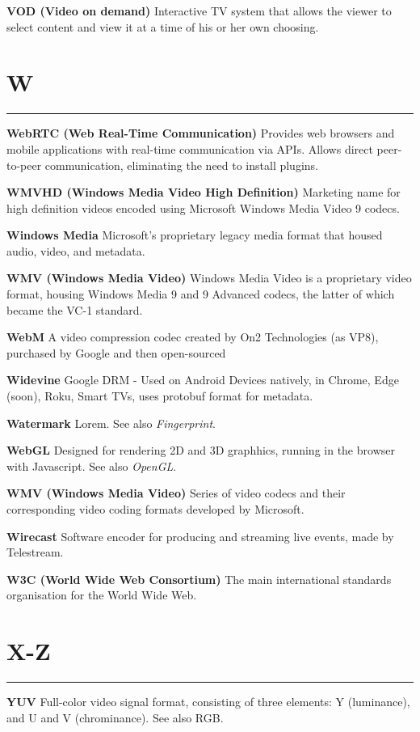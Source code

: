 \smallskip
\textbf{VOD (Video on demand)}
Interactive TV system that allows the viewer to select content and view it at a time of his or her own choosing.


\section{W}
\hrule

\medskip
\textbf{WebRTC (Web Real-Time Communication)}
Provides web browsers and mobile applications with real-time communication via APIs. Allows direct peer-to-peer communication, eliminating the need to install plugins.

\smallskip
\textbf{WMVHD (Windows Media Video High Definition)}
Marketing name for high definition videos encoded using Microsoft Windows Media Video 9 codecs.

\smallskip
\textbf{Windows Media}
Microsoft's proprietary legacy media format that housed audio, video, and metadata.

\smallskip
\textbf{WMV (Windows Media Video)}
Windows Media Video is a proprietary video format, housing Windows Media 9 and 9 Advanced codecs, the latter of which became the VC-1 standard.

\smallskip
\textbf{WebM}
A video compression codec created by On2 Technologies (as VP8), purchased by Google and then open-sourced

\smallskip
\textbf{Widevine}
Google DRM - Used on Android Devices natively, in Chrome, Edge (soon), Roku, Smart TVs, uses protobuf format for metadata.

\smallskip
\textbf{Watermark}
Lorem. See also \textit{Fingerprint}.

\smallskip
\textbf{WebGL}
Designed for rendering 2D and 3D graphhics, running in the browser with Javascript. See also \textit{OpenGL}.

\smallskip
\textbf{WMV (Windows Media Video)}
Series of video codecs and their corresponding video coding formats developed by Microsoft.

\smallskip
\textbf{Wirecast}
Software encoder for producing and streaming live events, made by Telestream.

\smallskip
\textbf{W3C (World Wide Web Consortium)}
The main international standards organisation for the World Wide Web.

\section{X-Z}
\hrule

\medskip
\textbf{YUV}
Full-color video signal format, consisting of three elements: Y (luminance), and U and V (chrominance). See also RGB.
